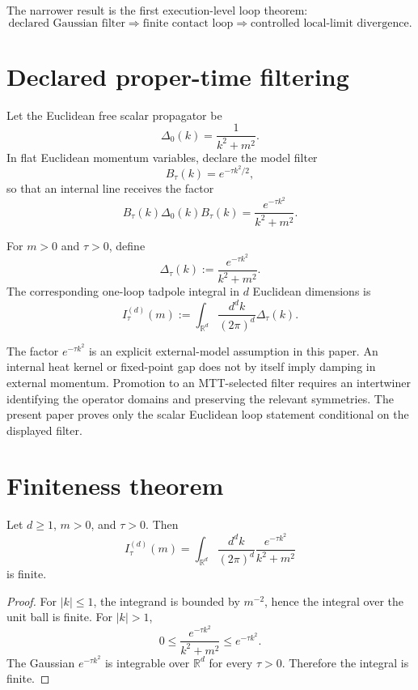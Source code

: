 \documentclass[11pt]{article}
\begin{document}
The narrower result is the first execution-level loop theorem:
\[
\text{declared Gaussian filter}\Rightarrow\text{finite contact loop}\Rightarrow\text{controlled local-limit divergence}.
\]

\section{Declared proper-time filtering}

Let the Euclidean free scalar propagator be
\[
\Delta_0(k)=\frac{1}{k^2+m^2}.
\]
In flat Euclidean momentum variables, declare the model filter
\[
B_\tau(k)=e^{-\tau k^2/2},
\]
so that an internal line receives the factor
\[
B_\tau(k)\Delta_0(k)B_\tau(k)
=
\frac{e^{-\tau k^2}}{k^2+m^2}.
\]

\begin{definition}
For \(m>0\) and \(\tau>0\), define
\[
\Delta_\tau(k):=\frac{e^{-\tau k^2}}{k^2+m^2}.
\]
The corresponding one-loop tadpole integral in \(d\) Euclidean dimensions is
\[
I_\tau^{(d)}(m):=\int_{\mathbb R^d}\frac{d^d k}{(2\pi)^d}\Delta_\tau(k).
\]
\end{definition}

\begin{remark}
The factor \(e^{-\tau k^2}\) is an explicit external-model assumption in this paper.  An
internal heat kernel or fixed-point gap does not by itself imply damping in external momentum.
Promotion to an MTT-selected filter requires an intertwiner identifying the operator domains
and preserving the relevant symmetries.  The present paper proves only the scalar Euclidean
loop statement conditional on the displayed filter.
\end{remark}

\section{Finiteness theorem}

\begin{theorem}
Let \(d\ge1\), \(m>0\), and \(\tau>0\). Then
\[
I_\tau^{(d)}(m)
=
\int_{\mathbb R^d}\frac{d^d k}{(2\pi)^d}
\frac{e^{-\tau k^2}}{k^2+m^2}
\]
is finite.
\end{theorem}

\begin{proof}
For \(|k|\le1\), the integrand is bounded by \(m^{-2}\), hence the integral over the unit ball is finite. For \(|k|>1\),
\[
0\le \frac{e^{-\tau k^2}}{k^2+m^2}\le e^{-\tau k^2}.
\]
The Gaussian \(e^{-\tau k^2}\) is integrable over \(\mathbb R^d\) for every \(\tau>0\). Therefore the integral is finite.
\end{proof}
\end{document}
